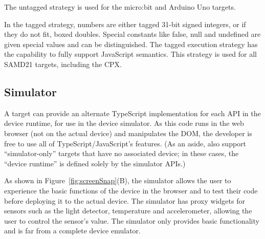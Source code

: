 The untagged strategy is used for the micro:bit and Arduino Uno targets. 

In the tagged strategy, numbers are either tagged 31-bit signed integers, or if they do not fit, 
boxed doubles. Special constants like false, null and undefined are given special values 
and can be distinguished. The tagged execution strategy has the capability to fully support
JavaScript semantics. This strategy is used for all SAMD21 targets, including the CPX.

\subsection{Simulator}

A \MC target can provide an alternate TypeScript implementation for each API in the device runtime, for use in the device
simulator. As this code runs in the web browser (not on the actual device) and manipulates the DOM, the developer is free to
use all of TypeScript/JavaScript's features. (As an aside, \MC also support ``simulator-only'' targets that have no 
associated device; in these cases, the ``device runtime'' is defined solely by the simulator APIs.) 

As shown in Figure~\ref{fig:screenSnap}(B), the simulator allows the user to experience the basic functions of the device 
in the browser and to test their code
before deploying it to the actual device. The simulator has proxy widgets for sensors such as the 
light detector, temperature and accelerometer, allowing the user to control the sensor's value.  
The simulator only provides basic functionality
and is far from a complete device emulator. 


